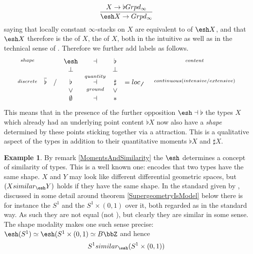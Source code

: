 \documentclass[12pt,titlepage]{article}
\newcommand{\itexarray}[1]{\begin{matrix}#1\end{matrix}}
\theoremstyle{plain}
\theoremstyle{definition}
\newtheorem{example}{Example}
\theoremstyle{remark}
\begin{document}
\begin{displaymath}
\frac{X \to \flat Grpd_\infty}{\esh  X\to Grpd_\infty}
\end{displaymath}
saying that locally constant $\infty$-stacks on $X$ are equivalent to  of $\esh  X$, and that $\esh  X$ therefore is the  of $X$, the  of $X$, both in the intuitive as well as in the technical sense of .
Therefore we further add labels as follows.
\begin{displaymath}
\itexarray{
\stackrel{shape}{} && & \esh  &\stackrel{}{\dashv}& \flat &  & & \stackrel{content}{}
\\
&& & \bot &\stackrel{}{}& \bot
\\
\stackrel{discrete}{} &\overline{\flat}& / & \flat &\stackrel{quantity}{\dashv}& \sharp & = loc_{\not\not} &   & \stackrel{continuous (intensive/extensive)}{}
\\
&& & \vee &\stackrel{ground}{}& \vee
\\
&& & \emptyset &\dashv& \ast &
}
\end{displaymath}
This means that in the presence of the further opposition $\esh  \dashv \flat$ the types $X$ which already had an underlying point content $\flat X$ now also have a \emph{shape} determined by these points sticking together via a  attraction. This is a qualitative aspect of the types in addition to their quantitative moments $\flat X$ and $\sharp X$.
\begin{example}
\label{ShapeAsAConceptOfSimilarity}\hypertarget{ShapeAsAConceptOfSimilarity}{}
By remark \ref{MomentsAndSimilarity} the  $\esh $ determines a concept of similarity of types. This is a well known one:  encodes that two types have the same shape. $X$ and $Y$ may look like different differential geometric spaces, but $(X  similar_{\esh } Y)$ holds if they have the same shape.
In the standard  given by , discussed in some detail around theorem \ref{SupergeometryIsModel} below there is for instance the  $S^1$ and the  $S^1 \times (0,1)$ over it, both regarded as  in the standard way. As such they are not equal (not ), but clearly they are similar in some sense. The shape modality makes one such sense precise: $\esh  (S^1) \simeq \esh  (S^1 \times (0,1) \simeq B \bbZ$ and hence
\begin{displaymath}
S^1  similar_{\esh }  (S^1 \times (0,1))
\end{displaymath}
\end{example}
\end{document}
